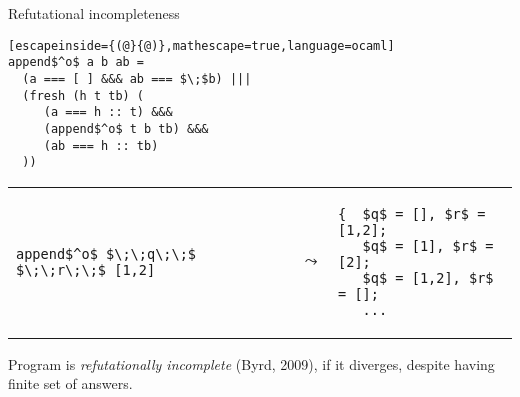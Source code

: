 \documentclass{beamer}
\let\\\tabularnewline
\let\\\tabularnewline
\theoremstyle{definition}
\theoremstyle{plain} %
\begin{document}
\begin{frame}[fragile]{Refutational incompleteness}

\begin{lstlisting}[escapeinside={(@}{@)},mathescape=true,language=ocaml]
append$^o$ a b ab = 
  (a === [ ] &&& ab === $\;$b) |||
  (fresh (h t tb) (
     (a === h :: t) &&&
     (append$^o$ t b tb) &&&
     (ab === h :: tb)
  ))
 \end{lstlisting}
 
 \vskip3mm

\begin{tabular}{lcl}
\begin{lstlisting}
append$^o$ $\;\;q\;\;$ $\;\;r\;\;$ [1,2]
  \end{lstlisting} &
  $\leadsto$ &
  \begin{lstlisting}
{  $q$ = [], $r$ = [1,2];
   $q$ = [1], $r$ = [2];
   $q$ = [1,2], $r$ = [];
   ...
  \end{lstlisting}
\end{tabular}

\vskip3mm

Program is \emph{refutationally incomplete} (Byrd, 2009), if it diverges, despite having finite set of answers.

\end{frame}
\end{document}

